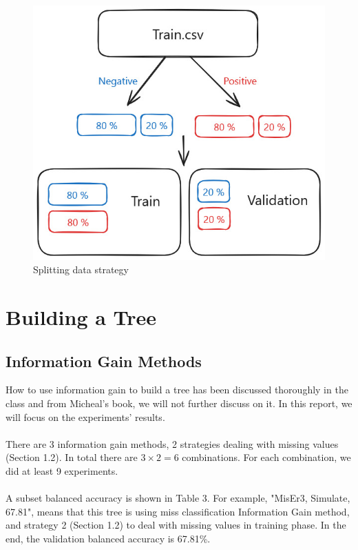 \documentclass{article}
\begin{document}
\begin{figure}[H]
  \centering
  \includegraphics[width=1\linewidth]{Fig/Imblanced_data.jpg}
  \caption{Splitting data strategy}
\end{figure}





\section{Building a Tree}
\subsection{Information Gain Methods}
How to use information gain to build a tree has been discussed thoroughly in the class and from Micheal's book, we will not further discuss on it. In this report, we will focus on the experiments' results.\\\\
There are 3 information gain methods, 2 strategies dealing with missing values (Section 1.2). In total there are $3\times2 = 6$ combinations. For each combination, we did at least 9 experiments.\\\\ 
A subset balanced accuracy is shown in Table 3. For example, "MisEr3, Simulate, 67.81", means that this tree is using miss classification Information Gain method, and strategy 2 (Section 1.2) to deal with missing values in training phase. In the end, the validation balanced accuracy is 67.81\%.\\\\
\end{document}
